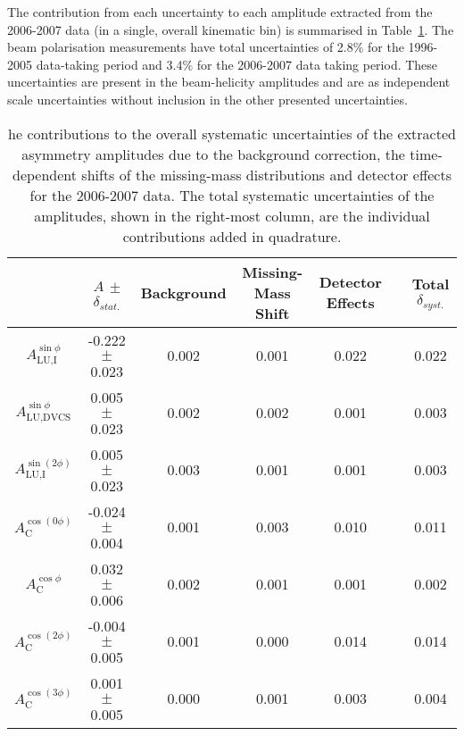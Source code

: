 The contribution from each uncertainty to each amplitude extracted from the 2006-2007 data (in a single, overall kinematic bin) is summarised in Table~\ref{table_systematic_contributions_0607}. The beam polarisation measurements have total uncertainties of 2.8\% for the 1996-2005 data-taking period and 3.4\% for the 2006-2007 data taking period. These uncertainties are present in the beam-helicity amplitudes and are as independent scale uncertainties without inclusion in the other presented uncertainties.
\begin{table}
 \begin{center}
\resizebox{\textwidth}{!} {
 \begin{tabular}{|c|c||c|c|c|c|c|}
  \hline
 & $A$ $\pm$ $\delta_{stat.}$& Background & Missing-Mass Shift  & Detector Effects & & Total $\delta_{syst.}$ \\
  \hline
  \hline
  $A_{\textrm{LU,I}}^{\sin\phi}$ & -0.222  $\pm$  0.023  & 0.002 & 0.001 & 0.022 & & 0.022 \\
  \hline
  $A_{\textrm{LU,DVCS}}^{\sin\phi}$ & 0.005  $\pm$  0.023  & 0.002 & 0.002 & 0.001 & & 0.003 \\
  \hline
  $A_{\textrm{LU,I}}^{\sin(2\phi)}$ & 0.005  $\pm$  0.023  & 0.003 & 0.001 & 0.001 & & 0.003 \\
  \hline
  \hline
  $A_{\textrm{C}}^{\cos(0\phi)}$ & -0.024 $\pm$  0.004 & 0.001 & 0.003 & 0.010 & & 0.011 \\
  \hline
  $A_{\textrm{C}}^{\cos\phi}$ & 0.032  $\pm$  0.006 & 0.002 & 0.001 & 0.001 & & 0.002 \\
  \hline
  $A_{\textrm{C}}^{\cos(2\phi)}$ & -0.004  $\pm$  0.005 & 0.001 & 0.000 & 0.014 & & 0.014 \\
  \hline
  $A_{\textrm{C}}^{\cos(3\phi)}$ & 0.001  $\pm$   0.005 & 0.000 & 0.001 & 0.003 & & 0.004 \\
  \hline
 \end{tabular}
}
  \caption{he contributions to the overall systematic uncertainties of the extracted asymmetry amplitudes due to the background correction, the time-dependent shifts of the missing-mass distributions and detector effects for the 2006-2007 data. The total
systematic uncertainties of the amplitudes, shown in the right-most column, are the individual contributions added in quadrature.}
  \label{table_systematic_contributions_0607}
\end{center}
\end{table}
